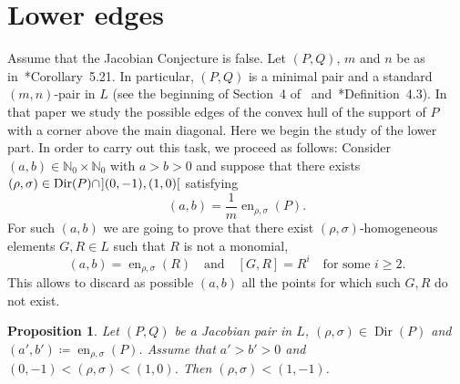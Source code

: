 \documentclass[reqno,a4paper]{amsart}
\newtheorem{proposition}[theorem]{Proposition}
\theoremstyle{definition}
\theoremstyle{remark}
\DeclareMathOperator{\en}{en}
\DeclareMathOperator{\Dir}{Dir}
\begin{document}
\section{Lower edges}\label{lower edges}
\setcounter{equation}{0}

Assume that the Jacobian Conjecture is false. Let $(P,Q)$, $m$ and $n$ be as in~\cite{GGV}*{Corollary~5.21}. In particular, $(P,Q)$ is a minimal pair and a standard $(m,n)$-pair in $L$ (see the beginning of Section~4 of~\cite{GGV} and~\cite{GGV}*{Definition~4.3}). In that paper we study the possible edges of the convex hull of the support of $P$ with a corner above the main diagonal. Here we begin the study of the lower part. In order to carry out this task, we proceed as follows: Consider $(a,b)\in\mathds{N}_0\times \mathds{N}_0$ with $a>b>0$ and suppose that there exists $(\rho,\sigma)\in \Dir(P) \cap \hspace{0.7pt}](0,-1),(1,0)[$ satisfying
$$
(a,b)=\frac 1m\en_{\rho,\sigma}(P).
$$
For such $(a,b)$ we are going to prove that there exist $(\rho,\sigma)$-homogeneous elements $G,R\in L$ such that $R$ is not a monomial,
$$
(a,b)=\en_{\rho,\sigma}(R)\quad\text{and}\quad [G,R]= R^i\quad\text{for some $i\ge 2$}.
$$
This allows to discard as possible $(a,b)$ all the points for which such $G, R$ do not exist.

\begin{proposition}\label{restriccion de direcciones} Let $(P,Q)$ be a Jacobian pair in $L$, $(\rho,\sigma)\in \Dir(P)$ and
$(a',b')\coloneqq \en_{\rho,\sigma}(P)$. As\-sume that $a'>b'>0$ and $(0,-1)<(\rho,\sigma)<(1,0)$. Then $(\rho,\sigma)<(1,-1)$.
\end{proposition}
\end{document}
